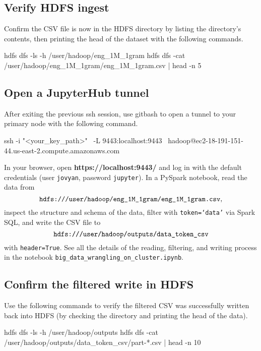 \documentclass[11pt]{article}
\begin{document}
\subsection{Verify HDFS ingest}

Confirm the CSV file is now in the HDFS directory by listing the directory's contents, then printing the head of the dataset with the following commands.\\

\begin{terminal}
hdfs dfs -ls -h /user/hadoop/eng_1M_1gram
hdfs dfs -cat /user/hadoop/eng_1M_1gram/eng_1M_1gram.csv | head -n 5
\end{terminal}

\subsection{Open a JupyterHub tunnel}
After exiting the previous ssh session, use gitbash to open a tunnel to your primary node with the following command.\\
\begin{terminal}
ssh -i "<your_key_path>" \
    -L 9443:localhost:9443 \
    hadoop@ec2-18-191-151-44.us-east-2.compute.amazonaws.com
\end{terminal}

\noindent In your browser, open \textbf{https://localhost:9443/} and log in with the default credentials (user \texttt{jovyan}, password \texttt{jupyter}). In a PySpark notebook, read the data from 
$$
\verb|hdfs:///user/hadoop/eng_1M_1gram/eng_1M_1gram.csv|,
$$
inspect the structure and schema of the data, filter with \texttt{token=`data'} via Spark SQL, and write the CSV file to $$\verb|hdfs:///user/hadoop/outputs/data_token_csv|$$ with \texttt{header=True}. See all the details of the reading, filtering, and writing process in the notebook \texttt{big\_data\_wrangling\_on\_cluster.ipynb}.

\subsection{Confirm the filtered write in HDFS}

Use the following commands to verify the filtered CSV was successfully written back into HDFS (by checking the directory and printing the head of the data).\\

\begin{terminal}
hdfs dfs -ls -h /user/hadoop/outputs
hdfs dfs -cat /user/hadoop/outputs/data_token_csv/part-*.csv | head -n 10
\end{terminal}
\end{document}
